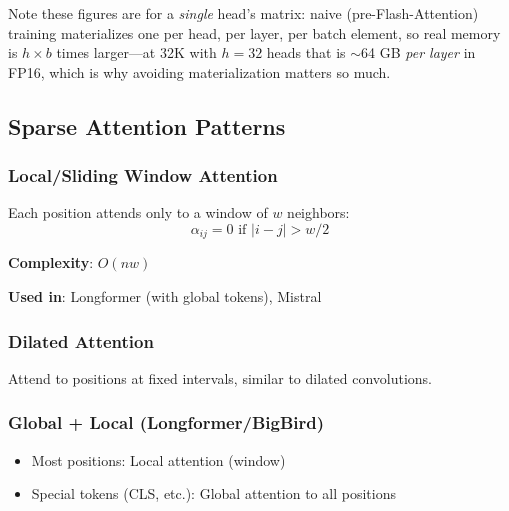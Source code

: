 Note these figures are for a \emph{single} head's matrix: naive (pre-Flash-Attention) training materializes one per head, per layer, per batch element, so real memory is $h \times b$ times larger---at 32K with $h=32$ heads that is $\sim$64 GB \emph{per layer} in FP16, which is why avoiding materialization matters so much.

\subsection{Sparse Attention Patterns}

\subsubsection{Local/Sliding Window Attention}

Each position attends only to a window of $w$ neighbors:
\begin{equation}
\alpha_{ij} = 0 \text{ if } |i - j| > w/2
\end{equation}

\textbf{Complexity}: $O(nw)$

\textbf{Used in}: Longformer (with global tokens), Mistral

\subsubsection{Dilated Attention}

Attend to positions at fixed intervals, similar to dilated convolutions.

\subsubsection{Global + Local (Longformer/BigBird)}

\begin{itemize}
    \item Most positions: Local attention (window)
    \item Special tokens (CLS, etc.): Global attention to all positions
\end{itemize}

